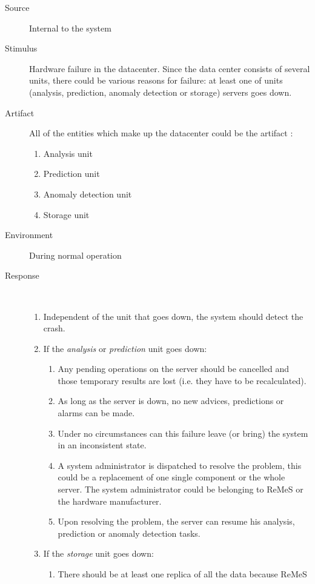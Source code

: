 \begin{description}
	\item[Source] Internal to the system
	\item[Stimulus] Hardware failure in the datacenter. Since the data center
	consists of several units, there could be various reasons for failure: at
	least one of units (analysis, prediction, anomaly detection or storage)
	servers goes down.
	\item[Artifact] All of the entities which make up the datacenter could be the
	artifact :
	\begin{enumerate}
	  \item Analysis unit
	  \item Prediction unit
	  \item Anomaly detection unit
	  \item Storage unit
	\end{enumerate}
	\item[Environment] During normal operation
	\item[Response] \
	\begin{enumerate}
	  \item Independent of the unit that goes down, the system should detect the
	  crash.
	  \item If the \emph{analysis} or \emph{prediction} unit goes down:
	  \begin{enumerate}
	    \item Any pending operations on the server should be cancelled and those
	    temporary results are lost (i.e. they have to be recalculated).
	    \item As long as the server is down, no new advices, predictions or alarms
	    can be made.
	    \item Under no circumstances can this failure leave (or bring) the system
	    in an inconsistent state.
	    \item A system administrator is dispatched to resolve the problem, this
	    could be a replacement of one single component or the whole server. The system administrator
	    could be belonging to ReMeS or the hardware manufacturer.
	    \item Upon resolving the problem, the server can resume his analysis,
	    prediction or anomaly detection tasks.
	  \end{enumerate}
	  \item If the \emph{storage} unit goes down:
	  \begin{enumerate}
	   \item There should be at least one replica of all the data because ReMeS

\end{enumerate}
\end{enumerate}
\end{description}
